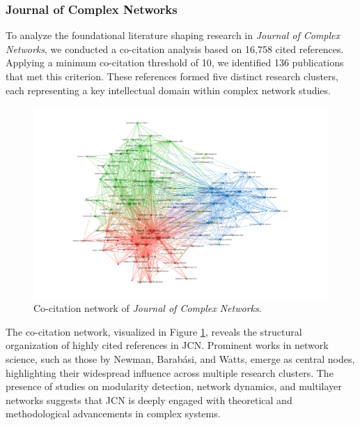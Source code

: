 \documentclass[twocolumn]{article}
\begin{document}
		
		\subsubsection*{Journal of Complex Networks}
		
		To analyze the foundational literature shaping research in \textit{Journal of Complex Networks}, we conducted a co-citation analysis based on 16,758 cited references. Applying a minimum co-citation threshold of 10, we identified 136 publications that met this criterion. These references formed five distinct research clusters, each representing a key intellectual domain within complex network studies.
		
		\begin{figure}[htbp]
			\centering
			\includegraphics[width=\columnwidth]{"Journal of Complex Networks/VOS/Co-citation.pdf"}
			\caption{Co-citation network of \textit{Journal of Complex Networks}.}
			\label{fig.fig10}
		\end{figure}
		
		The co-citation network, visualized in Figure \ref{fig.fig10}, reveals the structural organization of highly cited references in JCN. Prominent works in network science, such as those by Newman, Barabási, and Watts, emerge as central nodes, highlighting their widespread influence across multiple research clusters. The presence of studies on modularity detection, network dynamics, and multilayer networks suggests that JCN is deeply engaged with theoretical and methodological advancements in complex systems.
		
\end{document}
